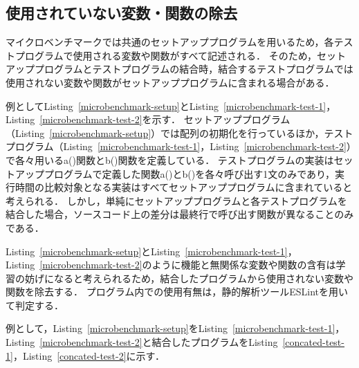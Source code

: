 \documentclass[11pt]{jreport}
\begin{document}


\subsection{使用されていない変数・関数の除去}


マイクロベンチマークでは共通のセットアッププログラムを用いるため，各テストプログラムで使用される変数や関数がすべて記述される．
そのため，セットアッププログラムとテストプログラムの結合時，結合するテストプログラムでは使用されない変数や関数がセットアッププログラムに含まれる場合がある．

例としてListing~\ref{microbenchmark-setup}とListing~\ref{microbenchmark-test-1}，Listing~\ref{microbenchmark-test-2}を示す．
セットアッププログラム（Listing~\ref{microbenchmark-setup}）では配列の初期化を行っているほか，テストプログラム（Listing~\ref{microbenchmark-test-1}，Listing~\ref{microbenchmark-test-2}）で各々用いるa()関数とb()関数を定義している．
テストプログラムの実装はセットアッププログラムで定義した関数a()とb()を各々呼び出す1文のみであり，実行時間の比較対象となる実装はすべてセットアッププログラムに含まれていると考えられる．
しかし，単純にセットアッププログラムと各テストプログラムを結合した場合，ソースコード上の差分は最終行で呼び出す関数が異なることのみである．

Listing~\ref{microbenchmark-setup}とListing~\ref{microbenchmark-test-1}，Listing~\ref{microbenchmark-test-2}のように機能と無関係な変数や関数の含有は学習の妨げになると考えられるため，結合したプログラムから使用されない変数や関数を除去する．
プログラム内での使用有無は，静的解析ツールESLintを用いて判定する．

例として，Listing~\ref{microbenchmark-setup}をListing~\ref{microbenchmark-test-1}，Listing~\ref{microbenchmark-test-2}と結合したプログラムをListing~\ref{concated-test-1}，Listing~\ref{concated-test-2}に示す．
\end{document}
